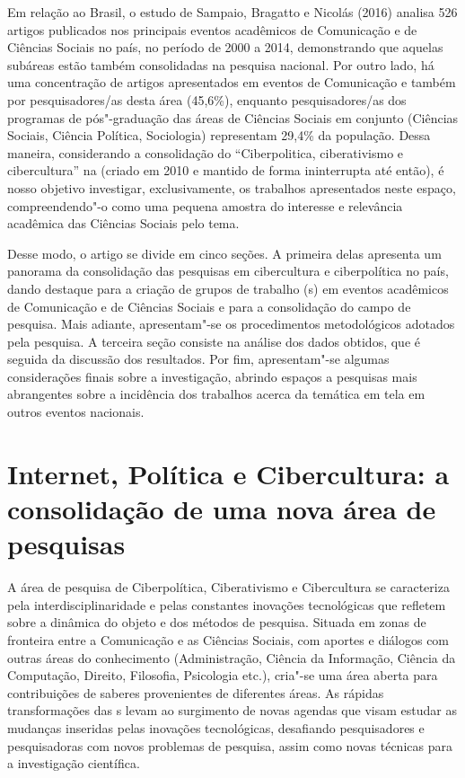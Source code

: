 Em relação ao Brasil, o estudo de Sampaio, Bragatto e Nicolás (2016)
analisa 526 artigos publicados nos principais eventos acadêmicos de
Comunicação e de Ciências Sociais no país, no período de 2000 a 2014,
demonstrando que aquelas subáreas estão também consolidadas na pesquisa
nacional. Por outro lado, há uma concentração de artigos apresentados em
eventos de Comunicação e também por pesquisadores/as desta área
(45,6\%), enquanto pesquisadores/as dos programas de pós"-graduação das
áreas de Ciências Sociais em conjunto (Ciências Sociais, Ciência
Política, Sociologia) representam 29,4\% da população. Dessa maneira,
considerando a consolidação do  ``Ciberpolitica, ciberativismo e
cibercultura'' na  (criado em 2010 e mantido de forma ininterrupta
até então), é nosso objetivo investigar, exclusivamente, os trabalhos
apresentados neste espaço, compreendendo"-o como uma pequena amostra do
interesse e relevância acadêmica das Ciências Sociais pelo tema.

Desse modo, o artigo se divide em cinco seções. A primeira delas
apresenta um panorama da consolidação das pesquisas em cibercultura e
ciberpolítica no país, dando destaque para a criação de grupos de
trabalho (s) em eventos acadêmicos de Comunicação e de Ciências
Sociais e para a consolidação do campo de pesquisa. Mais adiante,
apresentam"-se os procedimentos metodológicos adotados pela pesquisa. A
terceira seção consiste na análise dos dados obtidos, que é seguida da
discussão dos resultados. Por fim, apresentam"-se algumas considerações
finais sobre a investigação, abrindo espaços a pesquisas mais
abrangentes sobre a incidência dos trabalhos acerca da temática em tela
em outros eventos nacionais.

\section{Internet, Política e Cibercultura: a consolidação de uma nova área de pesquisas}

A área de pesquisa de Ciberpolítica, Ciberativismo e Cibercultura se
caracteriza pela interdisciplinaridade e pelas constantes inovações
tecnológicas que refletem sobre a dinâmica do objeto e dos métodos de
pesquisa. Situada em zonas de fronteira entre a Comunicação e as
Ciências Sociais, com aportes e diálogos com outras áreas do
conhecimento (Administração, Ciência da Informação, Ciência da
Computação, Direito, Filosofia, Psicologia etc.), cria"-se uma área
aberta para contribuições de saberes provenientes de diferentes áreas.
As rápidas transformações das s levam ao surgimento de novas agendas
que visam estudar as mudanças inseridas pelas inovações tecnológicas,
desafiando pesquisadores e pesquisadoras com novos problemas de
pesquisa, assim como novas técnicas para a investigação científica.

